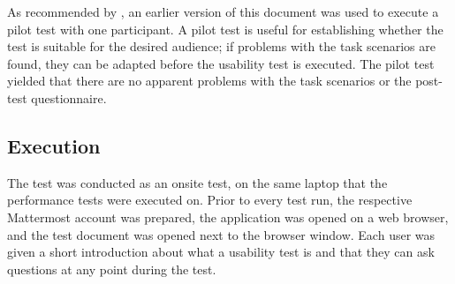 As recommended by \citet{rubin2008handbook}, an earlier version of this document was used to execute a pilot test with one participant.
A pilot test is useful for establishing whether the test is suitable for the desired audience; if problems with the task scenarios are found, they can be adapted before the usability test is executed.
The pilot test yielded that there are no apparent problems with the task scenarios or the post-test questionnaire.

%
%
%
%
%
%


\subsection{Execution}

The test was conducted as an onsite test, on the same laptop that the performance tests were executed on.
Prior to every test run, the respective Mattermost account was prepared, the application was opened on a web browser, and the test document was opened next to the browser window.
Each user was given a short introduction about what a usability test is and that they can ask questions at any point during the test.

